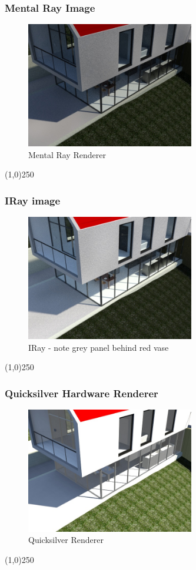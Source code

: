 \begin{frame}
\frametitle{Mental Ray Image}
\begin{figure}
	\centering
		\includegraphics[height=5.5cm]{img/RenderEngine/Revit3DSMentalRay.jpg}
	\caption{Mental Ray Renderer}
	\label{fig:MentalRay}
\end{figure}
\end{frame}
\begin{center}\line(1,0){250}\end{center}



\begin{frame}
\frametitle{IRay image}
\begin{figure}
	\centering
		\includegraphics[height=5.5cm]{img/RenderEngine/Revit3DSIRay.jpg}
	\caption{IRay - note grey panel behind red vase}
	\label{fig:IRay}
\end{figure}
\end{frame}
\begin{center}\line(1,0){250}\end{center}


\begin{frame}
\frametitle{Quicksilver Hardware Renderer}
\begin{figure}
	\centering
	\includegraphics[height=5.5cm]{img/RenderEngine/Revit3DSQuickSilver.jpg}
	\caption{Quicksilver Renderer}
	\label{fig:QuickSilver}
\end{figure}
\end{frame}
\begin{center}\line(1,0){250}\end{center}


